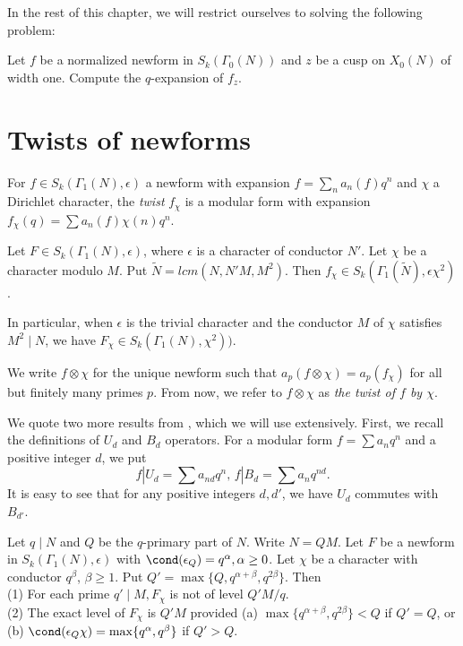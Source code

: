 \documentclass [11pt, proquest] {uwthesis}[2015/03/03]
\begin{document}
In the rest of this chapter, we will restrict ourselves to solving the following problem: 

\begin{problem}
Let $f$ be a normalized newform in $S_k(\Gamma_0(N))$ and $z$ be a cusp on $X_0(N)$ of width one. Compute the $q$-expansion of $f_z$.
\end{problem}


\section{Twists of newforms}

For $f \in S_k(\Gamma_1(N), \epsilon)$ a newform with expansion $f = \sum_n a_n(f) q^n$ and $\chi$ a Dirichlet character, the {\it twist} $f_\chi$ is a modular form with expansion $f_\chi (q) = \sum a_n(f) \chi(n)  q^n$. 

\begin{Lemma}\cite[Proposition 3.1]{atkin1978twists}
Let $F \in S_k(\Gamma_1(N), \epsilon)$, where $\epsilon$ is a character of conductor $N'$.  Let $\chi$ be a character modulo $M$. Put $\tilde{N} = lcm(N, N'M, M^2)$. Then $f_\chi \in S_k(\Gamma_1(\tilde{N}), \epsilon \chi^2)$.
\end{Lemma}

In particular, when $\epsilon$ is the trivial character and the conductor $M$ of $\chi$ satisfies $M^2 \mid N$, we have
$F_\chi \in S_k(\Gamma_1(N), \chi^2))$.

We write $f \otimes \chi$ for the unique newform such that $a_p(f \otimes \chi) = a_p(f_\chi)$ for all but finitely many primes $p$. From now, we refer to $f \otimes \chi$ as {\it the twist of $f$ by $\chi$}. 

We quote two more results from \cite{atkin1978twists}, which we will use extensively. First, we recall the definitions of  $U_d$ and $B_d$ operators. For a modular form $f = \sum a_n q^n$ and a positive integer $d$, we put 
\[
	f |U_d = \sum a_{nd} q^n, \,  f |B_d = \sum a_n q^{nd}.
\]
It is easy to see that for any positive integers $d,d'$, we have $U_d$ commutes with $B_{d'}$.





\begin{Lemma}\cite[Theorem 3.1]{atkin1978twists} \label{lemma: winnie-level}
Let $q \mid N$ and $Q$ be the $q$-primary part of $N$. Write $N = QM$. Let $F$ be a newform in $S_k(\Gamma_1(N), \epsilon)$ with $\cond(\epsilon_Q) = q^{\alpha}, \alpha \geq 0$. Let $\chi$ be a character with conductor $q^{\beta}$, $\beta \geq 1$. Put $Q' = \max\{Q,q^{\alpha + \beta}, q^{2\beta}\}$. Then \\
(1)  For each prime $q' \mid M, F_\chi$ is not of level $Q'M/q$. \\
(2)  The exact level of $F_\chi$ is $Q'M$ provided (a) $\max\{q^{\alpha + \beta}, q^{2\beta}\} < Q$ if $Q' = Q$, or 
(b) $\cond(\epsilon_Q \chi) = \max \{q^{\alpha}, q^{\beta} \}$ if $Q' > Q$.
\end{Lemma}
\end{document}
